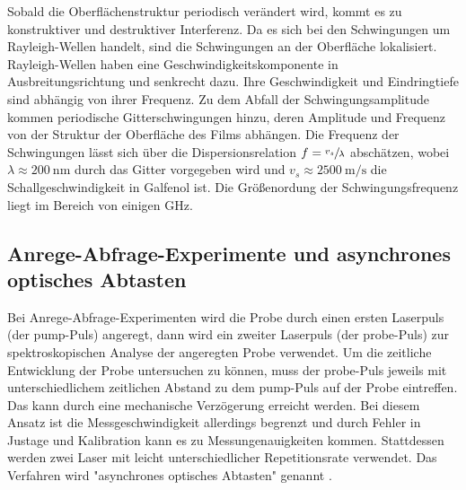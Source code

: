 Sobald die Oberflächenstruktur periodisch verändert wird, kommt es zu konstruktiver und destruktiver Interferenz. Da es sich bei den Schwingungen um Rayleigh-Wellen handelt, sind die Schwingungen an der Oberfläche lokalisiert. Rayleigh-Wellen haben eine Geschwindigkeitskomponente in Ausbreitungsrichtung und senkrecht dazu. Ihre Geschwindigkeit und Eindringtiefe sind abhängig von ihrer Frequenz. Zu dem Abfall der Schwingungsamplitude kommen periodische Gitterschwingungen hinzu, deren Amplitude und Frequenz von der Struktur der Oberfläche des Films abhängen. Die Frequenz der Schwingungen lässt sich über die Dispersionsrelation $f = \sfrac{v_s}{\lambda}$ abschätzen, wobei $\lambda \approx \SI{200}{\nano\metre}$ durch das Gitter vorgegeben wird und $v_s \approx \SI{2500}{\metre\per\second}$ die Schallgeschwindigkeit in Galfenol \cite{galfenol} ist. Die Größenordung der Schwingungsfrequenz liegt im Bereich von einigen GHz.

\subsection{Anrege-Abfrage-Experimente und asynchrones optisches Abtasten}

Bei Anrege-Abfrage-Experimenten wird die Probe durch einen ersten Laserpuls (der pump-Puls) angeregt, dann wird ein zweiter Laserpuls (der probe-Puls) zur spektroskopischen Analyse der angeregten Probe verwendet. Um die zeitliche Entwicklung der Probe untersuchen zu können, muss der probe-Puls jeweils mit unterschiedlichem zeitlichen Abstand zu dem pump-Puls auf der Probe eintreffen. Das kann durch eine mechanische Verzögerung erreicht werden. Bei diesem Ansatz ist die Messgeschwindigkeit allerdings begrenzt und durch Fehler in Justage und Kalibration kann es zu Messungenauigkeiten kommen. Stattdessen werden zwei Laser mit leicht unterschiedlicher Repetitionsrate verwendet. Das Verfahren wird "asynchrones optisches Abtasten" genannt \cite{ASOPS}.
